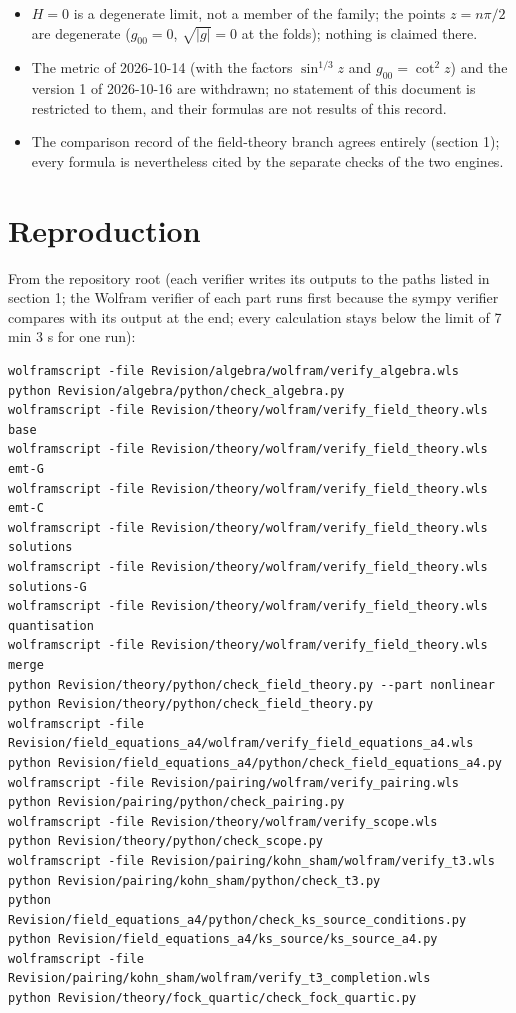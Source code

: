 \documentclass[11pt]{article}
\begin{document}
\begin{itemize}
\item $H = 0$ is a degenerate limit, not a member of the family; the points $z = n\pi/2$ are degenerate ($g_{00} = 0$, $\sqrt{|g|} = 0$ at the folds); nothing is claimed there.
\item The metric of 2026-10-14 (with the factors $\sin^{1/3}z$ and $g_{00} = \cot^2 z$) and the version 1 of 2026-10-16 are withdrawn; no statement of this document is restricted to them, and their formulas are not results of this record.
\item The comparison record of the field-theory branch agrees entirely (section 1); every formula is nevertheless cited by the separate checks of the two engines.
\end{itemize}

\section{Reproduction}

From the repository root (each verifier writes its outputs to the paths listed in section 1; the Wolfram verifier of each part runs first because the sympy verifier compares with its output at the end; every calculation stays below the limit of 7 min 3 s for one run):

\begin{Verbatim}[fontsize=\small]
wolframscript -file Revision/algebra/wolfram/verify_algebra.wls
python Revision/algebra/python/check_algebra.py
wolframscript -file Revision/theory/wolfram/verify_field_theory.wls base
wolframscript -file Revision/theory/wolfram/verify_field_theory.wls emt-G
wolframscript -file Revision/theory/wolfram/verify_field_theory.wls emt-C
wolframscript -file Revision/theory/wolfram/verify_field_theory.wls solutions
wolframscript -file Revision/theory/wolfram/verify_field_theory.wls solutions-G
wolframscript -file Revision/theory/wolfram/verify_field_theory.wls quantisation
wolframscript -file Revision/theory/wolfram/verify_field_theory.wls merge
python Revision/theory/python/check_field_theory.py --part nonlinear
python Revision/theory/python/check_field_theory.py
wolframscript -file Revision/field_equations_a4/wolfram/verify_field_equations_a4.wls
python Revision/field_equations_a4/python/check_field_equations_a4.py
wolframscript -file Revision/pairing/wolfram/verify_pairing.wls
python Revision/pairing/python/check_pairing.py
wolframscript -file Revision/theory/wolfram/verify_scope.wls
python Revision/theory/python/check_scope.py
wolframscript -file Revision/pairing/kohn_sham/wolfram/verify_t3.wls
python Revision/pairing/kohn_sham/python/check_t3.py
python Revision/field_equations_a4/python/check_ks_source_conditions.py
python Revision/field_equations_a4/ks_source/ks_source_a4.py
wolframscript -file Revision/pairing/kohn_sham/wolfram/verify_t3_completion.wls
python Revision/theory/fock_quartic/check_fock_quartic.py
\end{Verbatim}
\end{document}
